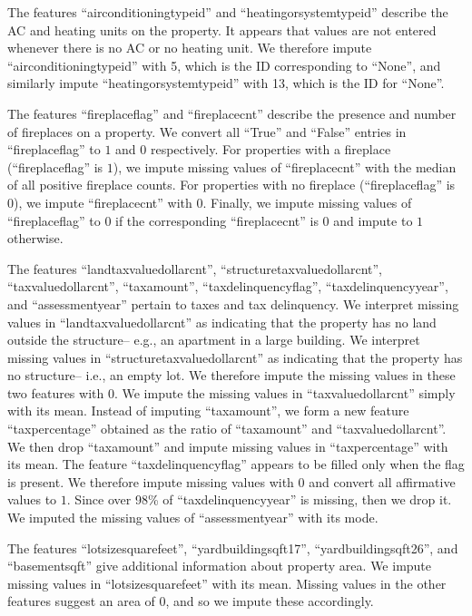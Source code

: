 \documentclass[12pt]{article}
\begin{document}
The features ``airconditioningtypeid'' and ``heatingorsystemtypeid'' describe the AC and heating units on the property. It appears that values are not entered whenever there is no AC or no heating unit. We therefore impute ``airconditioningtypeid'' with 5, which is the ID corresponding to ``None'', and similarly impute ``heatingorsystemtypeid'' with 13, which is the ID for ``None''.

The features ``fireplaceflag'' and ``fireplacecnt'' describe the presence and number of fireplaces on a property. We convert all ``True'' and ``False'' entries in ``fireplaceflag'' to $1$ and $0$ respectively. For properties with a fireplace (``fireplaceflag'' is $1$), we impute missing values of ``fireplacecnt'' with the median of all positive fireplace counts. For properties with no fireplace (``fireplaceflag'' is $0$), we impute ``fireplacecnt'' with $0$. Finally, we impute missing values of ``fireplaceflag'' to $0$ if the corresponding ``fireplacecnt'' is $0$ and impute to $1$ otherwise.

The features ``landtaxvaluedollarcnt'', ``structuretaxvaluedollarcnt'', ``taxvaluedollarcnt'', ``taxamount'', ``taxdelinquencyflag'', ``taxdelinquencyyear'', and ``assessmentyear'' pertain to taxes and tax delinquency. We interpret missing values in ``landtaxvaluedollarcnt'' as indicating that the property has no land outside the structure-- e.g., an apartment in a large building. We interpret missing values in ``structuretaxvaluedollarcnt'' as indicating that the property has no structure-- i.e., an empty lot. We therefore impute the missing values in these two features with $0$. We impute the missing values in ``taxvaluedollarcnt'' simply with its mean. Instead of imputing ``taxamount'', we form a new feature ``taxpercentage'' obtained as the ratio of ``taxamount'' and ``taxvaluedollarcnt''. We then drop ``taxamount'' and impute missing values in ``taxpercentage'' with its mean. The feature ``taxdelinquencyflag'' appears to be filled only when the flag is present. We therefore impute missing values with $0$ and convert all affirmative values to $1$. Since over 98\% of ``taxdelinquencyyear'' is missing, then we drop it. We imputed the missing values of ``assessmentyear'' with its mode.

The features ``lotsizesquarefeet'', ``yardbuildingsqft17'', ``yardbuildingsqft26'', and ``basementsqft'' give additional information about property area. We impute missing values in ``lotsizesquarefeet'' with its mean. Missing values in the other features suggest an area of $0$, and so we impute these accordingly.
\end{document}
